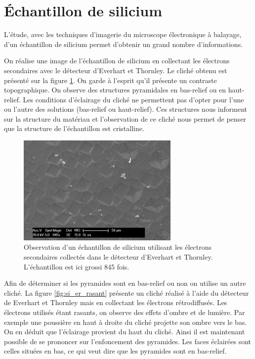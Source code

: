 \documentclass[a4paper,12pt]{article}
\newcommand\ett{Everhart et Thornley\xspace}
\begin{document}
 

\section{Échantillon de silicium}

L'étude, avec les techniques d'imagerie du microscope électronique à balayage, d'un échantillon de silicium permet d'obtenir un grand nombre d'informations.

On réalise une image de l'échantillon de silicium en collectant les électrons secondaires avec le détecteur d'\ett.
Le cliché obtenu est présenté sur la figure \ref{fig:si_es}. On garde à l'esprit qu'il présente un contraste topographique.
On observe des structures pyramidales en bas-relief ou en haut-relief. Les conditions d'éclairage du cliché ne permettent
pas d'opter pour l'une ou l'autre des solutions (bas-relief ou haut-relief). Ces structures nous informent sur la structure
du matériau et l'observation de ce cliché nous permet de penser que la structure de l'échantillon est cristalline.



\begin{figure}
\centering
\includegraphics[width=0.7\textwidth]{images/si_es.png}
\caption{Observation d'un échantillon de silicium utilisant les électrons secondaires collectés dans le détecteur d'\ett. L'échantillon est ici grossi 845 fois.}
\label{fig:si_es}
\end{figure}

Afin de déterminer si les pyramides sont en bas-relief ou non on utilise un autre cliché. La figure \ref{fig:si_er_rasant} présente
un cliché réalisé à l'aide du détecteur de \ett mais en collectant les électrons rétrodiffusés. Les électrons utilisés étant rasants,
on observe des effets d'ombre et de lumière. Par exemple une poussière en haut à droite du cliché projette son ombre vers le bas.
On en déduit que l'éclairage provient du haut du cliché. Ainsi il est maintenant possible de se prononcer sur l'enfoncement des pyramides.
Les faces éclairées sont celles situées en bas, ce qui veut dire que les pyramides sont en bas-relief.
\end{document}
